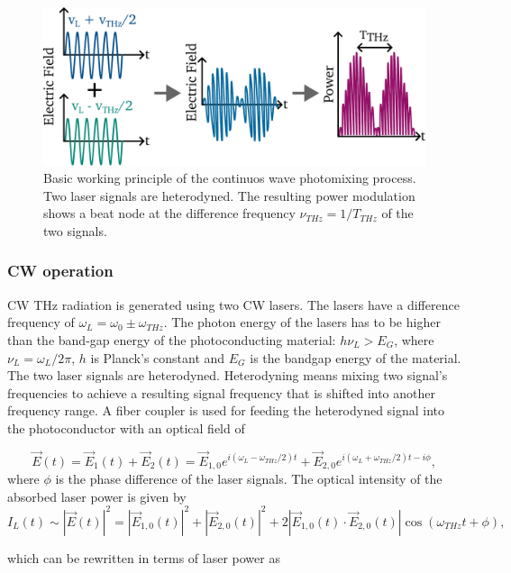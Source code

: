 \begin{figure}
	\includegraphics[width=0.85\linewidth]{figures/cw_principles.pdf}
	\centering
	\caption{Basic working principle of the continuos wave photomixing process. Two laser signals are heterodyned. The resulting power modulation shows a beat node at the difference frequency $\nu_{THz} = 1/T_{THz}$ of the two signals.}
	\label{fig:cw_basics}
\end{figure}

\subsubsection{CW operation}
CW THz radiation is generated using two CW lasers. The lasers have a difference frequency of $\omega_L = \omega_0 \pm \omega_{THz}$. The photon energy of the lasers has to be higher than the band-gap energy of the photoconducting material: $h\nu_L > E_G$, 
where $\nu_L = \omega_L / 2\pi$, $h$ is Planck’s constant and $E_G$ is the bandgap energy of the material. The two laser signals are heterodyned. Heterodyning means mixing two signal's frequencies to achieve a resulting signal frequency that is shifted into another frequency range. A fiber coupler is used for feeding the heterodyned signal into the photoconductor with an optical field of

\begin{equation}
	\vec{E}(t) = \vec{E}_1(t) + \vec{E}_2(t) = \vec{E}_{1,0}e^{i(\omega_L - \omega_{THz}/2)t} + \vec{E}_{2,0}e^{i(\omega_L + \omega_{THz}/2)t - i\phi},
\end{equation}
where $\phi$ is the phase difference of the laser signals. The optical intensity of the absorbed laser power is given by 
\begin{equation}
	I_L(t) \sim |\vec{E}(t)|^2 = |\vec{E}_{1,0}(t)|^2 + |\vec{E}_{2,0}(t)|^2 + 2|\vec{E}_{1,0}(t) \cdot \vec{E}_{2,0}(t)|\cos(\omega_{THz}t + \phi), 
\end{equation}

which can be rewritten in terms of laser power as 

